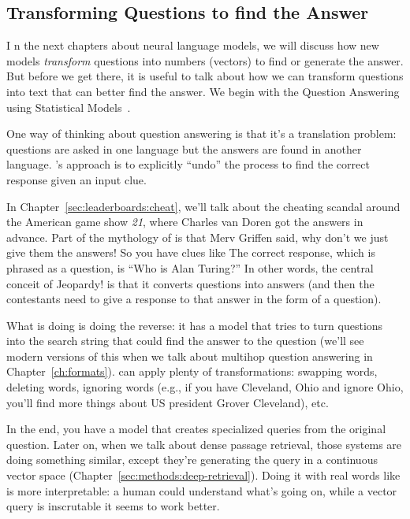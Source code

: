 \subsection{Transforming Questions to find the Answer}
I
n the next chapters about neural language models, we will discuss how new
models \emph{transform} questions into numbers (vectors) to find or generate
the answer.
%
But before we get there, it is useful to talk about how we can transform
questions into text that can better find the answer.
%
We begin with the Question Answering using Statistical Models~\citep[]{radev-01}.

One way of thinking about question answering is that it's a translation
problem: questions are asked in one language but the answers are found in
another language.
%
's approach is to explicitly ``undo'' the process to find the
correct response given an input clue.

In Chapter~\ref{sec:leaderboards:cheat}, we'll talk about the cheating scandal
around the American game show \textit{21}, where Charles van Doren got
the answers in advance.
%
Part of the mythology of \jeopardy{} is that Merv Griffen said, why
don’t we just give them the answers!
%
So you have clues like 
%
The correct response, which is phrased as a question, is
``Who is Alan Turing?''
%
In other words, the central conceit of Jeopardy! is that it converts questions
into answers (and then the contestants need to give a response to that answer
in the form of a question).

What  is doing is doing the reverse: it has a model that
tries to turn questions into the search string that could find the
answer to the question (we'll see modern versions of this when we talk about
multihop question answering in Chapter~\ref{ch:formats}).
%
 can apply plenty of transformations: swapping words,
deleting words, ignoring words (e.g., if you have Cleveland, Ohio and ignore
Ohio, you’ll find more things about US president Grover Cleveland), etc.


In the end, you have a model that creates specialized queries from the
original question.
%
Later on, when we talk about dense passage retrieval, those systems are doing
something similar, except they’re generating the query in a continuous vector
space (Chapter~\ref{sec:methods:deep-retrieval}).
%
Doing it with real words like  is more interpretable: a human could
understand what’s going on, while a vector query is inscrutable it seems to
work better.

